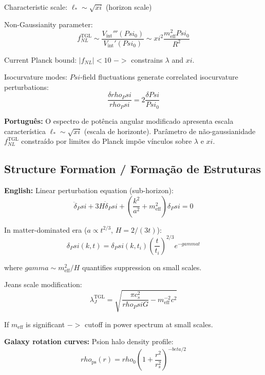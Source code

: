 \documentclass[12pt,a4paper]{article}
\def\Psi{Psi}%
\def\to{ -> }%
\def\beta{beta}%
\def\gamma{gamma}%
\def\xi{xi}%
\def\rho{rho}%
\begin{document}
Characteristic scale: $\ell_* \sim \sqrt{\xi}$ (horizon scale)

Non-Gaussianity parameter:
\begin{equation}
f_{NL}^{\text{TGL}} \sim \frac{V_{\text{int}}'''(\Psi_0)}{V_{\text{int}}'(\Psi_0)} \sim \xi^2\frac{m_{\text{eff}}^2\Psi_0}{R^2}
\end{equation}

Current Planck bound: $|f_{NL}| < 10$ $\to$ constrains $\lambda$ and $\xi$.

Isocurvature modes: $\Psi$-field fluctuations generate correlated isocurvature perturbations:
\begin{equation}
\frac{\delta\rho_\Psi}{\rho_\Psi} = 2\frac{\delta\Psi}{\Psi_0}
\end{equation}

\textbf{Português:} O espectro de potência angular modificado apresenta escala característica $\ell_* \sim \sqrt{\xi}$ (escala de horizonte). Parâmetro de não-gaussianidade $f_{NL}^{\text{TGL}}$ constraído por limites do Planck impõe vínculos sobre $\lambda$ e $\xi$.

\subsection{Structure Formation / Formação de Estruturas}

\textbf{English:} Linear perturbation equation (sub-horizon):
\begin{equation}
\ddot{\delta}_\Psi + 3H\dot{\delta}_\Psi + \left(\frac{k^2}{a^2} + m_{\text{eff}}^2\right)\delta_\Psi = 0
\end{equation}

In matter-dominated era ($a \propto t^{2/3}$, $H = 2/(3t)$):
\begin{equation}
\delta_\Psi(k,t) = \delta_\Psi(k,t_i)\left(\frac{t}{t_i}\right)^{2/3}e^{-\gamma t}
\end{equation}

where $\gamma \sim m_{\text{eff}}^2/H$ quantifies suppression on small scales.

Jeans scale modification:
\begin{equation}
\lambda_J^{\text{TGL}} = \sqrt{\frac{\pi c_s^2}{\rho_\Psi G} - m_{\text{eff}}^{-2}c^2}
\end{equation}

If $m_{\text{eff}}$ is significant $\to$ cutoff in power spectrum at small scales.

\textbf{Galaxy rotation curves:} Psion halo density profile:
\begin{equation}
\rho_{\text{ps}}(r) = \rho_0\left(1 + \frac{r^2}{r_s^2}\right)^{-\beta/2}
\end{equation}
\end{document}
